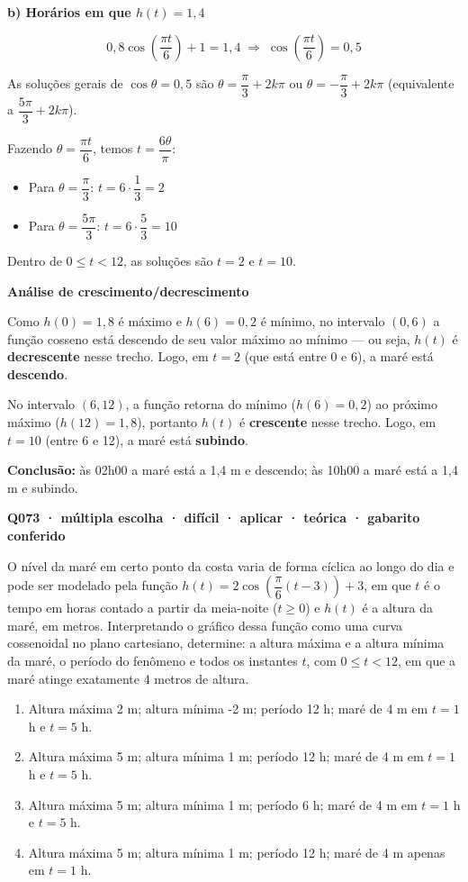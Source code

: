 \documentclass[11pt,a4paper]{article}
\begin{document}
\textbf{b) Horários em que $h(t)=1{,}4$}

$$0{,}8\cos\!\left(\frac{\pi t}{6}\right)+1 = 1{,}4 \;\Rightarrow\; \cos\!\left(\frac{\pi t}{6}\right) = 0{,}5$$

As soluções gerais de $\cos\theta = 0{,}5$ são $\theta = \dfrac{\pi}{3}+2k\pi$ ou $\theta = -\dfrac{\pi}{3}+2k\pi$ (equivalente a $\dfrac{5\pi}{3}+2k\pi$).

Fazendo $\theta = \dfrac{\pi t}{6}$, temos $t = \dfrac{6\theta}{\pi}$:

\begin{itemize}[nosep,leftmargin=*]
\item Para $\theta=\dfrac{\pi}{3}$: $t = 6\cdot\dfrac{1}{3} = 2$
\item Para $\theta=\dfrac{5\pi}{3}$: $t = 6\cdot\dfrac{5}{3} = 10$
\end{itemize}

Dentro de $0\le t<12$, as soluções são $t=2$ e $t=10$.

\textbf{Análise de crescimento/decrescimento}

Como $h(0)=1{,}8$ é máximo e $h(6)=0{,}2$ é mínimo, no intervalo $(0,6)$ a função cosseno está descendo de seu valor máximo ao mínimo — ou seja, $h(t)$ é \textbf{decrescente} nesse trecho. Logo, em $t=2$ (que está entre 0 e 6), a maré está \textbf{descendo}.

No intervalo $(6,12)$, a função retorna do mínimo ($h(6)=0{,}2$) ao próximo máximo ($h(12)=1{,}8$), portanto $h(t)$ é \textbf{crescente} nesse trecho. Logo, em $t=10$ (entre 6 e 12), a maré está \textbf{subindo}.

\textbf{Conclusão:} às 02h00 a maré está a 1,4 m e descendo; às 10h00 a maré está a 1,4 m e subindo.

\bigskip\noindent\textbf{Q073 · múltipla escolha · difícil · aplicar · teórica · gabarito conferido}\par\nopagebreak
O nível da maré em certo ponto da costa varia de forma cíclica ao longo do dia e pode ser modelado pela função $h(t) = 2\cos\left(\dfrac{\pi}{6}(t-3)\right) + 3$, em que $t$ é o tempo em horas contado a partir da meia-noite ($t \ge 0$) e $h(t)$ é a altura da maré, em metros. Interpretando o gráfico dessa função como uma curva cossenoidal no plano cartesiano, determine: a altura máxima e a altura mínima da maré, o período do fenômeno e todos os instantes $t$, com $0 \le t < 12$, em que a maré atinge exatamente 4 metros de altura.
\begin{enumerate}[label=(\alph*)]
\item Altura máxima 2 m; altura mínima -2 m; período 12 h; maré de 4 m em $t=1$ h e $t=5$ h.
\item Altura máxima 5 m; altura mínima 1 m; período 12 h; maré de 4 m em $t=1$ h e $t=5$ h.
\item Altura máxima 5 m; altura mínima 1 m; período 6 h; maré de 4 m em $t=1$ h e $t=5$ h.
\item Altura máxima 5 m; altura mínima 1 m; período 12 h; maré de 4 m apenas em $t=1$ h.
\end{enumerate}
\end{document}
